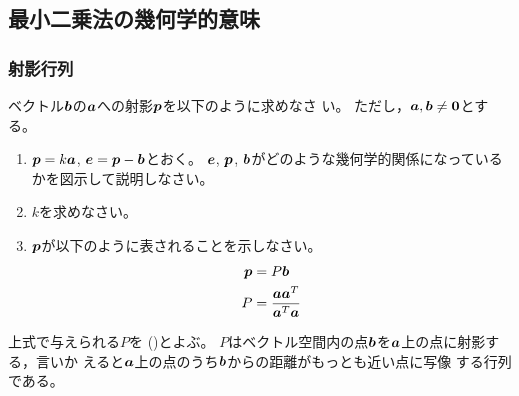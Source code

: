 \documentclass[twocolumn,11pt]{jarticle}
\begin{document}
\subsection{最小二乗法の幾何学的意味\prog}

\subsubsection{射影行列\prog}
\nquestion
ベクトル$\boldsymbol{b}$の$\boldsymbol{a}$への射影$\boldsymbol{p}$を以下のように求めなさ
い。
ただし，$\boldsymbol{a},\boldsymbol{b}\ne\boldsymbol{0}$とする。
\begin{enumerate}
\item $\boldsymbol{p}=k\boldsymbol{a}$, $\boldsymbol{e}=\boldsymbol{p}-\boldsymbol{b}$とおく。
  $\boldsymbol{e}$, $\boldsymbol{p}$, $\boldsymbol{b}$がどのような幾何学的関係になっている
  かを図示して説明しなさい。
\item $k$を求めなさい。
\item $\boldsymbol{p}$が以下のように表されることを示しなさい。
  \begin{align}
  \boldsymbol{p}&=P\boldsymbol{b}\notag\\
  P&=\frac{\boldsymbol{a}\boldsymbol{a}^T}{\boldsymbol{a}^T\boldsymbol{a}}\notag
  \end{align}
\end{enumerate}
\comment 上式で与えられる$P$を
()とよぶ。
$P$はベクトル空間内の点$\boldsymbol{b}$を$\boldsymbol{a}$上の点に射影する，言いか
えると$\boldsymbol{a}$上の点のうち$\boldsymbol{b}$からの距離がもっとも近い点に写像
する行列である。
\end{document}
